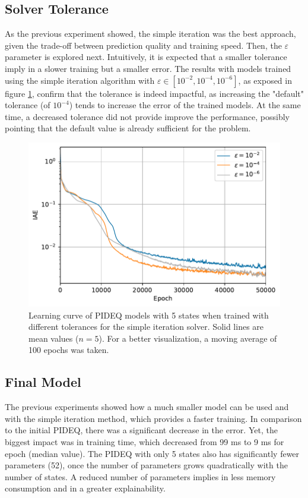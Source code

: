 \subsection{Solver Tolerance}

As the previous experiment showed, the simple iteration was the best approach, given the trade-off between prediction quality and training speed.
Then, the $\varepsilon$ parameter is explored next.
Intuitively, it is expected that a smaller tolerance imply in a slower training but a smaller error.
The results with models trained using the simple iteration algorithm with $\varepsilon \in \left[ 10^{-2}, 10^{-4},10^{-6} \right] $, as exposed in figure \ref{fig:epsilon-iae}, confirm that the tolerance is indeed impactful, as increasing the "default" tolerance (of $10^{-4}$) tends to increase the error of the trained models.
At the same time, a decreased tolerance did not provide improve the performance, possibly pointing that the default value is already sufficient for the problem.

\begin{figure}[h]
    \centering
    \includegraphics{images/exp_6_iae.pdf}
    \caption{Learning curve of \gls{PIDEQ} models with 5 states when trained with different tolerances for the simple iteration solver. Solid lines are mean values ($n=5$). For a better visualization, a moving average of 100 epochs was taken.}
    \label{fig:epsilon-iae}
\end{figure}

\subsection{Final Model}

The previous experiments showed how a much smaller model can be used and with the simple iteration method, which provides a faster training.
In comparison to the initial \gls{PIDEQ}, there was a significant decrease in the error.
Yet, the biggest impact was in training time, which decreased from 99 ms to 9 ms for epoch (median value). 
The \gls{PIDEQ} with only 5 states also has significantly fewer parameters (52), once the number of parameters grows quadratically with the number of states.
A reduced number of parameters implies in less memory consumption and in a greater explainability.

